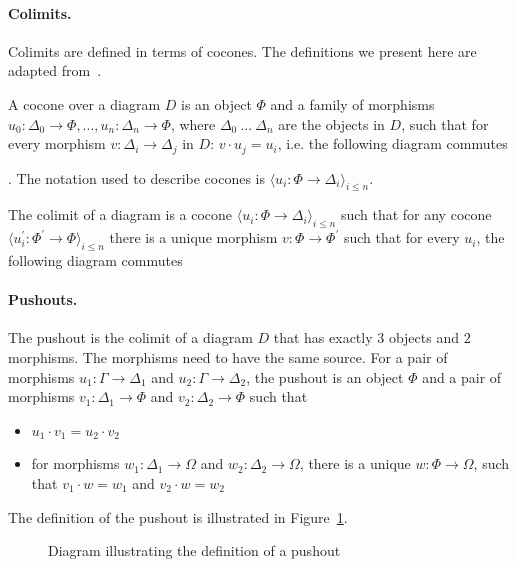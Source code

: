\paragraph{Colimits.}
Colimits are defined in terms of cocones. The definitions we present here are adapted from~\cite{sannella2012foundations}. 

A cocone over a diagram $D$ is an object $\Phi$ and a family of morphisms $u_0 : \Delta_0 \to \Phi, ..., u_{n} : \Delta_{n} \to \Phi$, 
where $\Delta_0\ ...\ \Delta_{n}$ are the objects in $D$, such that for every morphism $v : \Delta_i \to \Delta_j$ in $D$: $v \cdot u_j = u_i$, i.e. the following diagram commutes 
.
The notation used to describe cocones is 
$\langle u_i : \Phi \to \Delta_i \rangle_{i\leq n}$.

The colimit of a diagram is a cocone  
$\langle u_i : \Phi \to \Delta_i \rangle_{i\leq n}$ such that for any cocone 
$\langle u_i^{\prime} : \Phi^{\prime} \to \Phi \rangle_{i\leq n}$ there is a unique morphism $v : \Phi \to \Phi^\prime$ such that for every $u_i$, the following diagram commutes 

\paragraph{Pushouts.}
The pushout is the colimit of a diagram $D$ that has exactly $3$ objects and $2$ morphisms. The morphisms need to have the same source. For a pair of morphisms $u_1 : \Gamma \to \Delta_1$ and $u_2 : \Gamma \to \Delta_2$, the pushout is an object $\Phi$ and a pair of morphisms $v_1 : \Delta_1 \to \Phi$ and $v_2 : \Delta_2 \to \Phi$ such that 
\begin{itemize}
\item $u_1 \cdot v_1 = u_2 \cdot v_2 $
\item for morphisms $w_1 : \Delta_1 \to \Omega$ and $w_2 : \Delta_2 \to \Omega$, there is a unique $w : \Phi \to \Omega$, such that 
$v_1 \cdot w = w_1$ and $v_2 \cdot w = w_2$
\end{itemize}
The definition of the pushout is illustrated in Figure~\ref{fig:pushoutDef}. 
\begin{figure}
\caption{Diagram illustrating the definition of a pushout}
\label{fig:pushoutDef}
\end{figure}

